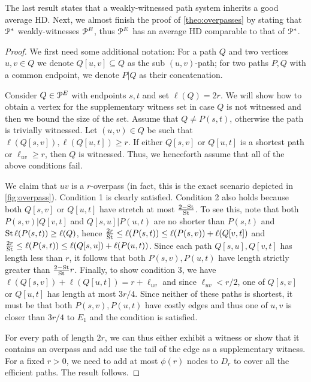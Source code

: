 The last result states that a weakly-witnessed path system inherits a good average HD.
Next, we almost finish the proof of \cref{theo:overpasses} by stating that $\mathcal{P}^*$ weakly-witnesses $\mathcal{P}^E$, thus $\mathcal{P}^E$ has an average HD comparable to that of $\mathcal{P}^*$.
\begin{proof}
We first need some additional notation:
For a path $Q$ and two vertices $u,v\in Q$ we denote $Q[u,v]\subseteq Q$ as the sub $(u,v)$-path; for two paths $P,Q$ with a common endpoint, we denote $P|Q$ as their concatenation.

Consider $Q\in\mathcal{P}^E$ with endpoints $s,t$ and set $\ell(Q)=2r$.
We will show how to obtain a vertex for the supplementary witness set in case $Q$ is not witnessed and then we bound the size of the set.
Assume that $Q\neq P(s,t)$, otherwise the path is trivially witnessed.
Let $(u,v)\in Q$ be such that $\ell(Q[s,v]),\ell(Q[u,t])\geq r$. 
If either $Q[s,v]$ or $Q[u,t]$ is a shortest path or $\ell_{uv}\geq r$, then $Q$ is witnessed. Thus, we henceforth assume that all of the above conditions fail.

We claim that $uv$ is a $r$-overpass (in fact, this is the exact scenario depicted in \cref{fig:overpass}).
Condition 1 is clearly satisfied. 
Condition 2 also holds because both $Q[s,v]$ or $Q[u,t]$ have stretch at most $\frac{2-\operatorname{St}}{\operatorname{St}}$.
To see this, note that both $P(s,v)|Q[v,t]$ and $Q[s,u]|P(u,t)$ are no shorter than $P(s,t)$ and $\operatorname{St}\ell(P(s,t))\geq \ell(Q)$, hence
$\frac{2r}{\operatorname{St}}\leq \ell(P(s,t)) \leq  \ell(P(s,v)) + \ell(Q[v,t])$ and $\frac{2r}{\operatorname{St}} \leq \ell(P(s,t)) \leq  \ell(Q[s,u]) + \ell(P(u,t))$.
Since each path $Q[s,u],Q[v,t]$ has length less than $r$, it follows that both $P(s,v),P(u,t)$ have length strictly greater than $\frac{2-\operatorname{St}}{\operatorname{St}}r$. %
Finally, to show condition 3, we have $\ell(Q[s,v])+\ell(Q[u,t])=r+\ell_{uv}$ and since $\ell_{uv}<r/2$, one of $Q[s,v]$ or $Q[u,t]$ has length at most $3r/4$.
Since neither of these paths is shortest, it must be that both $P(s,v),P(u,t)$ have costly edges and thus one of $u,v$ is closer than $3r/4$ to $E_1$ and the condition is satisfied.

For every path of length $2r$, we can thus either exhibit a witness or show that it contains an overpass and add use the tail of the edge as a supplementary witness.
For a fixed $r>0$, we need to add at most $\phi(r)$ nodes to $D_r$ to cover all the efficient paths. 
The result follows.
\end{proof}

